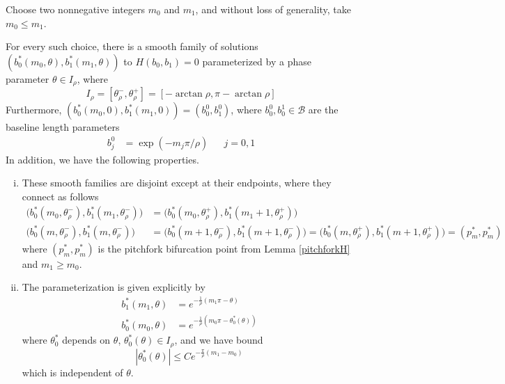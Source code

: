 \documentclass[thesis.tex]{subfiles}
\begin{document}

\begin{lemma}\label{thetaparamlemma}
Choose two nonnegative integers $m_0$ and $m_1$, and without loss of generality, take $m_0 \leq m_1$. 

For every such choice, there is a smooth family of solutions $( b_0^*(m_0, \theta), b_1^*(m_1, \theta) )$ to $H(b_0, b_1) = 0$ parameterized by a phase parameter $\theta \in I_\rho$, where
\begin{equation}\label{Irho}
I_\rho = [\theta_\rho^-, \theta_\rho^+] = [-\arctan \rho,\pi - \arctan \rho] 
\end{equation}
Furthermore, $(b_0^*(m_0, 0), b_1^*(m_1, 0)) = (b_0^0, b_1^0)$, where $b_0^0, b_0^1 \in \mathcal{B}$ are the baseline length parameters 
\begin{align}\label{bj0form}
b_j^0 &= \exp(-m_j \pi / \rho ) && j = 0, 1
\end{align}
In addition, we have the following properties.

\begin{enumerate}[(i)]
\item These smooth families are disjoint except at their endpoints, where they connect as follows
\begin{align*}
\Big( b_0^*(m_0, \theta_\rho^-), b_1^*(m_1, \theta_\rho^-) \Big) &= \Big( b_0^*(m_0, \theta_\rho^+), b_1^*(m_1+1, \theta_\rho^+) \Big) \\
\Big( b_0^*(m, \theta_\rho^-), b_1^*(m, \theta_\rho^-) \Big) &= \Big( b_0^*(m+1, \theta_\rho^-), b_1^*(m+1, \theta_\rho^-) \Big) = \Big( b_0^*(m, \theta_\rho^+), b_1^*(m+1, \theta_\rho^+) \Big) = (p^*_m, p^*_m)
\end{align*}
where $(p^*_m, p^*_m)$ is the pitchfork bifurcation point from Lemma \ref{pitchforkH} and $m_1 \geq m_0$.

\item The parameterization is given explicitly by
\begin{equation}\label{thetaparam}
\begin{aligned}
b_1^*(m_1, \theta) &= e^{-\frac{1}{\rho}(m_1 \pi - \theta) } \\
b_0^*(m_0, \theta) &= e^{-\frac{1}{\rho}(m_0 \pi - \theta_0^*(\theta)) }
\end{aligned}
\end{equation}
where $\theta_0^*$ depends on $\theta$, $\theta_0^*(\theta) \in I_\rho$, and we have bound
\begin{equation}\label{thetastarbound}
|\theta_0^*(\theta)| \leq C e^{ -\frac{\pi}{\rho}(m_1 - m_0)}
\end{equation}
which is independent of $\theta$.
\end{enumerate}


\end{lemma}
\end{document}

